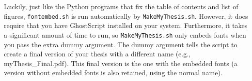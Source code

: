 \documentclass{iitthesis}
\begin{document}
Luckily, just like the Python programs that fix the table of contents and list of figures, 
{\tt fontembed.sh} is run automatically by {\tt MakeMyThesis.sh}.
However, it does require that you have GhostScript installed on your system. 
Furthermore, it takes a significant amount of time to run, 
so {\tt MakeMyThesis.sh} only embeds fonts when you pass the extra dummy argument. 
The dummy argument tells the script to create a final version of your thesis
with a different name (e.g., myThesis\_Final.pdf).
This final version is the one with the embedded fonts
(a version without embedded fonts is also retained, using the normal name).


\end{document}
